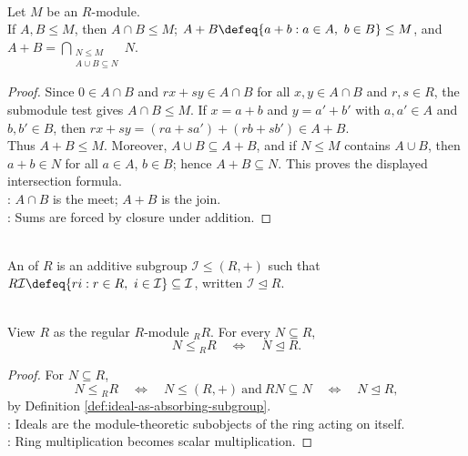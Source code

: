 \begin{proposition} \label{prop:submodule-intersection-sum} \\
Let $M$ be an $R$-module.\\
If $A,B\leq M$, then $A\cap B\leq M$; $A+B\defeq\{a+b:a\in A,\ b\in B\}\leq M$, and $A+B=\bigcap\limits_{\substack{N\leq M\\ A\cup B\subseteq N}}N$.
\begin{proof}
Since $0\in A\cap B$ and $rx+sy\in A\cap B$ for all $x,y\in A\cap B$ and $r,s\in R$, the submodule test gives $A\cap B\leq M$. If $x=a+b$ and $y=a'+b'$ with $a,a'\in A$ and $b,b'\in B$, then $rx+sy=(ra+sa')+(rb+sb')\in A+B$.\\
Thus $A+B\leq M$. Moreover, $A\cup B\subseteq A+B$, and if $N\leq M$ contains $A\cup B$, then $a+b\in N$ for all $a\in A$, $b\in B$; hence $A+B\subseteq N$. This proves the displayed intersection formula.\\
: $A\cap B$ is the meet; $A+B$ is the join.\\
: Sums are forced by closure under addition.
\end{proof}
\end{proposition}

\begin{definition} \label{def:ideal-as-absorbing-subgroup} \\
An  of $R$ is an additive subgroup $\mathcal{I}\leq (R,+)$ such that $R\mathcal{I}\defeq\{ri:r\in R,\ i\in\mathcal{I}\}\subseteq \mathcal{I}$, written $\mathcal{I}\trianglelefteq R$.
\end{definition}

\begin{proposition} \label{prop:submodules-of-regular-module-are-ideals} \\
View $R$ as the regular $R$-module ${}_R R$. For every $N\subseteq R$,
\[
N\leq {}_R R \quad\Longleftrightarrow\quad N\trianglelefteq R.
\]
\begin{proof}
For $N\subseteq R$,
\[
N\leq {}_R R
\quad\Longleftrightarrow\quad
N\leq (R,+)\ \text{and}\ RN\subseteq N
\quad\Longleftrightarrow\quad
N\trianglelefteq R,
\]
by Definition \ref{def:ideal-as-absorbing-subgroup}.\\
: Ideals are the module-theoretic subobjects of the ring acting on itself.\\
: Ring multiplication becomes scalar multiplication.
\end{proof}
\end{proposition}
